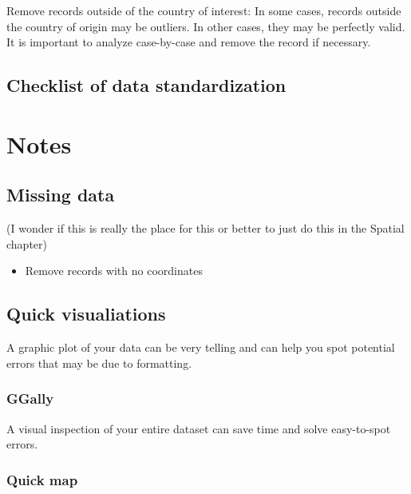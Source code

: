 \documentclass[
  letterpaper,
  DIV=11,
  numbers=noendperiod,
  oneside]{scrreprt}
\providecommand{\tightlist}{%
  \setlength{\itemsep}{0pt}\setlength{\parskip}{0pt}}\usepackage{longtable,booktabs,array}
\begin{document}
Remove records outside of the country of interest: In some cases,
records outside the country of origin may be outliers. In other cases,
they may be perfectly valid. It is important to analyze case-by-case and
remove the record if necessary.

\hypertarget{checklist-of-data-standardization}{%
\section{Checklist of data
standardization}\label{checklist-of-data-standardization}}


\hypertarget{notes}{%
\chapter{Notes}\label{notes}}

\hypertarget{missing-data}{%
\section{Missing data}\label{missing-data}}

(I wonder if this is really the place for this or better to just do this
in the Spatial chapter)

\begin{itemize}
\tightlist
\item
  Remove records with no coordinates
\end{itemize}

\hypertarget{quick-visualiations}{%
\section{Quick visualiations}\label{quick-visualiations}}

A graphic plot of your data can be very telling and can help you spot
potential errors that may be due to formatting.

\hypertarget{ggally}{%
\subsection{GGally}\label{ggally}}

A visual inspection of your entire dataset can save time and solve
easy-to-spot errors.

\hypertarget{quick-map}{%
\subsection{Quick map}\label{quick-map}}
\end{document}
